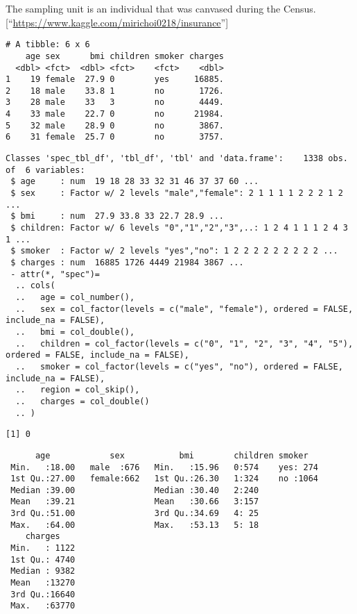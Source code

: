 \documentclass[]{article}
\begin{document}
The sampling unit is an individual that was canvased during the Census.
{[}``\url{https://www.kaggle.com/mirichoi0218/insurance}''{]}

\begin{verbatim}
# A tibble: 6 x 6
    age sex      bmi children smoker charges
  <dbl> <fct>  <dbl> <fct>    <fct>    <dbl>
1    19 female  27.9 0        yes     16885.
2    18 male    33.8 1        no       1726.
3    28 male    33   3        no       4449.
4    33 male    22.7 0        no      21984.
5    32 male    28.9 0        no       3867.
6    31 female  25.7 0        no       3757.
\end{verbatim}

\begin{verbatim}
Classes 'spec_tbl_df', 'tbl_df', 'tbl' and 'data.frame':    1338 obs. of  6 variables:
 $ age     : num  19 18 28 33 32 31 46 37 37 60 ...
 $ sex     : Factor w/ 2 levels "male","female": 2 1 1 1 1 2 2 2 1 2 ...
 $ bmi     : num  27.9 33.8 33 22.7 28.9 ...
 $ children: Factor w/ 6 levels "0","1","2","3",..: 1 2 4 1 1 1 2 4 3 1 ...
 $ smoker  : Factor w/ 2 levels "yes","no": 1 2 2 2 2 2 2 2 2 2 ...
 $ charges : num  16885 1726 4449 21984 3867 ...
 - attr(*, "spec")=
  .. cols(
  ..   age = col_number(),
  ..   sex = col_factor(levels = c("male", "female"), ordered = FALSE, include_na = FALSE),
  ..   bmi = col_double(),
  ..   children = col_factor(levels = c("0", "1", "2", "3", "4", "5"), ordered = FALSE, include_na = FALSE),
  ..   smoker = col_factor(levels = c("yes", "no"), ordered = FALSE, include_na = FALSE),
  ..   region = col_skip(),
  ..   charges = col_double()
  .. )
\end{verbatim}

\begin{verbatim}
[1] 0
\end{verbatim}

\begin{verbatim}
      age            sex           bmi        children smoker    
 Min.   :18.00   male  :676   Min.   :15.96   0:574    yes: 274  
 1st Qu.:27.00   female:662   1st Qu.:26.30   1:324    no :1064  
 Median :39.00                Median :30.40   2:240              
 Mean   :39.21                Mean   :30.66   3:157              
 3rd Qu.:51.00                3rd Qu.:34.69   4: 25              
 Max.   :64.00                Max.   :53.13   5: 18              
    charges     
 Min.   : 1122  
 1st Qu.: 4740  
 Median : 9382  
 Mean   :13270  
 3rd Qu.:16640  
 Max.   :63770  
\end{verbatim}
\end{document}
